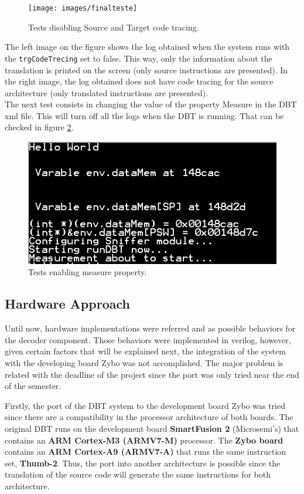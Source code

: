 \begin{figure}[H]
\centerline{
\texttt{[image: images/finalteste]}
}
\caption{Tests disabling Source and Target code tracing.}
\label{fig:finalteste}
\end{figure}


The left image on the figure shows the log obtained when the system runs with the \texttt{trgCodeTrecing} set to false. This way, only the information about the translation is printed on the screen (only source instructions are presented). In the right image, the log obtained does not have code tracing for the source architecture (only translated instructions are presented). \\

The next test consists in changing the value of the property Measure in the DBT xml file. This will turn off all the logs when the DBT is running. That can be checked in figure \ref{fig:val4}.

\begin{figure}[H]
\centerline{
\includegraphics[scale=0.6]{images/val4}
}
\caption{Tests enabling measure property.}
\label{fig:val4}
\end{figure}


\newpage
\subsection{Hardware Approach}

Until now, hardware implementations were referred and as possible behaviors for the decoder component. Those behaviors were implemented in verilog, however, given certain factors that will be explained next, the integration of the system with the developing board Zybo was not accomplished. The major problem is related with the deadline of the project since the port was only tried near the end of the semester.

Firstly, the port of the DBT system to the development board Zybo was tried since there are a compatibility in the processor architecture of both boards. The original DBT runs on the development board \textbf{SmartFusion 2} (Microsemi's) that contains an \textbf{ARM Cortex-M3 (ARMV7-M)} processor. The \textbf{Zybo board} contains an \textbf{ARM Cortex-A9 (ARMV7-A)} that runs the same instruction set, \textbf{Thumb-2}. Thus, the port into another architecture is possible since the translation of the source code will generate the same instructions for both architecture. 

